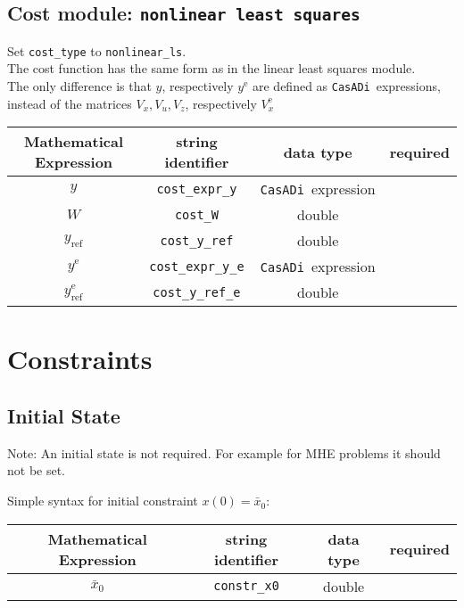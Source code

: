 \documentclass{article}
\newcommand{\code}[1]{\texttt{#1}}
\newcommand{\casadi}{\texttt{CasADi}}
\newcommand{\terminal}{^{\textrm{e}}}
\begin{document}
\subsection*{Cost module: \code{nonlinear least squares}}
Set \code{cost\_type} to \code{nonlinear\_ls}.\\
The cost function has the same form as in the linear least squares module.\\
The only difference is that $ y $, respectively $ y\terminal $ are defined as \casadi~expressions, instead of the matrices $ V_x, V_u, V_z $, respectively $ V_x\terminal $

\begin{table}[h!]
	\centering
	\begin{tabular}{|c|c|c|c|}
		\toprule
		Mathematical Expression & string identifier & data type & required \\ \midrule
		$ y $ & \code{cost\_expr\_y}    & \casadi~expression  & \mandatory   \\ \midrule
		$ W $ & \code{cost\_W}    & double  & \mandatory   \\ \midrule
		$ y_{\textrm{ref}} $ & \code{cost\_y\_ref}    & double & \mandatory    \\ \midrule
		$ y\terminal $ & \code{cost\_expr\_y\_e}    & \casadi~expression  & \mandatory   \\ \midrule
		$ y_{\textrm{ref}}\terminal $ & \code{cost\_y\_ref\_e}    & double  & \mandatory   \\
		\bottomrule
	\end{tabular}
\end{table}
\section{Constraints}
\subsection{Initial State}
Note: An initial state is not required.
For example for MHE problems it should not be set.

Simple syntax for initial constraint $x(0)=\bar{x}_0$:
\begin{table}[h]
	\centering
	\begin{tabular}{|c|c|c|c|}
		\toprule
		Mathematical Expression & string identifier & data type & required \\ \midrule
		$ \bar{x}_0 $ & \code{constr\_x0} & double & \optional \\ 		\bottomrule
	\end{tabular}
\end{table}
\end{document}
